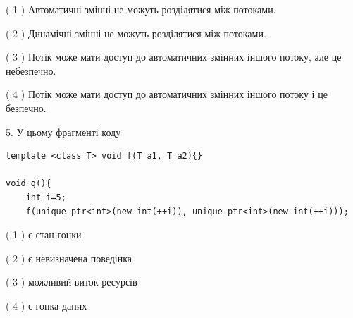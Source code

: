 \documentclass[12pt, ukrainian]{article}
\begin{document}
\begin {large}
{( 1 ) Автоматичні змінні не можуть розділятися між потоками.%

( 2 ) Динамічні змінні не можуть розділятися між потоками.%

( 3 ) Потік може мати доступ до автоматичних змінних іншого потоку, але це небезпечно.%

( 4 ) Потік може мати доступ до автоматичних змінних іншого потоку і це безпечно.%


5. У цьому фрагменті коду
\begin{verbatim}
template <class T> void f(T a1, T a2){}

void g(){
    int i=5;
    f(unique_ptr<int>(new int(++i)), unique_ptr<int>(new int(++i)));
\end{verbatim}

( 1 ) є стан гонки%

( 2 ) є невизначена поведінка%

( 3 ) можливий виток ресурсів%

( 4 ) є гонка даних%
}
\end {large}
\end{document}
